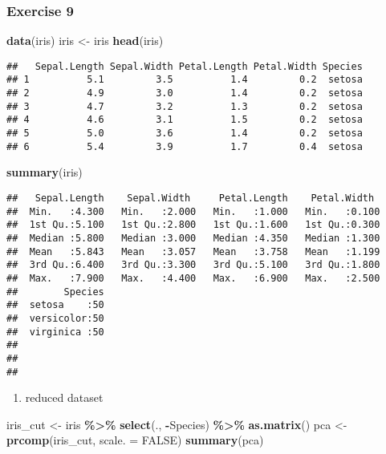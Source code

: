 \documentclass[
]{article}
\newenvironment{Shaded}{\begin{snugshade}}{\end{snugshade}}
\newcommand{\AttributeTok}[1]{\textcolor[rgb]{0.13,0.29,0.53}{#1}}
\newcommand{\ConstantTok}[1]{\textcolor[rgb]{0.56,0.35,0.01}{#1}}
\newcommand{\FunctionTok}[1]{\textcolor[rgb]{0.13,0.29,0.53}{\textbf{#1}}}
\newcommand{\NormalTok}[1]{#1}
\newcommand{\OtherTok}[1]{\textcolor[rgb]{0.56,0.35,0.01}{#1}}
\newcommand{\SpecialCharTok}[1]{\textcolor[rgb]{0.81,0.36,0.00}{\textbf{#1}}}
\providecommand{\tightlist}{%
  \setlength{\itemsep}{0pt}\setlength{\parskip}{0pt}}
\begin{document}
\subsubsection{Exercise 9}\label{exercise-9}

\begin{Shaded}
\begin{Highlighting}[]
\FunctionTok{data}\NormalTok{(iris)}
\NormalTok{iris }\OtherTok{\textless{}{-}}\NormalTok{ iris}
\FunctionTok{head}\NormalTok{(iris)}
\end{Highlighting}
\end{Shaded}

\begin{verbatim}
##   Sepal.Length Sepal.Width Petal.Length Petal.Width Species
## 1          5.1         3.5          1.4         0.2  setosa
## 2          4.9         3.0          1.4         0.2  setosa
## 3          4.7         3.2          1.3         0.2  setosa
## 4          4.6         3.1          1.5         0.2  setosa
## 5          5.0         3.6          1.4         0.2  setosa
## 6          5.4         3.9          1.7         0.4  setosa
\end{verbatim}

\begin{Shaded}
\begin{Highlighting}[]
\FunctionTok{summary}\NormalTok{(iris)}
\end{Highlighting}
\end{Shaded}

\begin{verbatim}
##   Sepal.Length    Sepal.Width     Petal.Length    Petal.Width   
##  Min.   :4.300   Min.   :2.000   Min.   :1.000   Min.   :0.100  
##  1st Qu.:5.100   1st Qu.:2.800   1st Qu.:1.600   1st Qu.:0.300  
##  Median :5.800   Median :3.000   Median :4.350   Median :1.300  
##  Mean   :5.843   Mean   :3.057   Mean   :3.758   Mean   :1.199  
##  3rd Qu.:6.400   3rd Qu.:3.300   3rd Qu.:5.100   3rd Qu.:1.800  
##  Max.   :7.900   Max.   :4.400   Max.   :6.900   Max.   :2.500  
##        Species  
##  setosa    :50  
##  versicolor:50  
##  virginica :50  
##                 
##                 
## 
\end{verbatim}

\begin{enumerate}
\def\labelenumi{\alph{enumi}.}
\tightlist
\item
  reduced dataset
\end{enumerate}

\begin{Shaded}
\begin{Highlighting}[]
\NormalTok{iris\_cut }\OtherTok{\textless{}{-}}\NormalTok{ iris }\SpecialCharTok{\%\textgreater{}\%}
  \FunctionTok{select}\NormalTok{(., }\SpecialCharTok{{-}}\NormalTok{Species) }\SpecialCharTok{\%\textgreater{}\%}
  \FunctionTok{as.matrix}\NormalTok{()}
\NormalTok{pca }\OtherTok{\textless{}{-}} \FunctionTok{prcomp}\NormalTok{(iris\_cut, }\AttributeTok{scale. =} \ConstantTok{FALSE}\NormalTok{)}
\FunctionTok{summary}\NormalTok{(pca)}
\end{Highlighting}
\end{Shaded}
\end{document}
